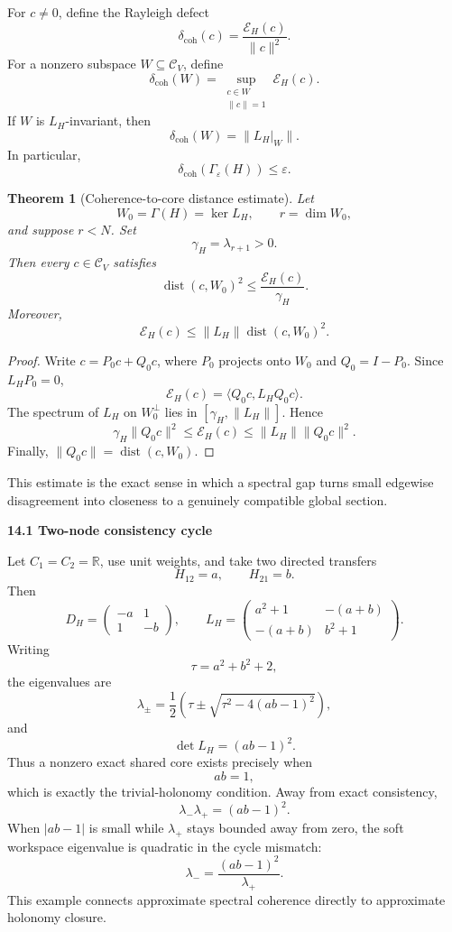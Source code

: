 \documentclass[11pt,letterpaper]{article}
\newcommand{\subtopic}[1]{%
 \vspace{0.45em}
 {\bfseries\color{AccentColor} #1\par}
}
\theoremstyle{plain}
\newtheorem{theorem}{Theorem}
\theoremstyle{definition}
\begin{document}
For \(c\neq0\), define the Rayleigh defect
\[
\delta_{\mathrm{coh}}(c)
=
\frac{\mathcal E_H(c)}{\|c\|^2}.
\]
For a nonzero subspace \(W\subseteq\mathcal C_V\), define
\[
\delta_{\mathrm{coh}}(W)
=
\sup_{\substack{c\in W\\\|c\|=1}}
\mathcal E_H(c).
\]
If \(W\) is \(L_H\)-invariant, then
\[
\delta_{\mathrm{coh}}(W)
=
\|L_H|_W\|.
\]
In particular,
\[
\delta_{\mathrm{coh}}(\Gamma_\varepsilon(H))
\leq\varepsilon.
\]

\begin{theorem}[Coherence-to-core distance estimate]\label{thm:poincare-workspace}
Let
\[
W_0=\Gamma(H)=\ker L_H,
\qquad
r=\dim W_0,
\]
and suppose \(r<N\). Set
\[
\gamma_H=\lambda_{r+1}>0.
\]
Then every \(c\in\mathcal C_V\) satisfies
\[
\boxed{
\operatorname{dist}(c,W_0)^2
\leq
\frac{\mathcal E_H(c)}{\gamma_H}.
}
\]
Moreover,
\[
\mathcal E_H(c)
\leq
\|L_H\|\operatorname{dist}(c,W_0)^2.
\]
\end{theorem}

\begin{proof}
Write \(c=P_0c+Q_0c\), where \(P_0\) projects onto \(W_0\) and
\(Q_0=I-P_0\). Since \(L_HP_0=0\),
\[
\mathcal E_H(c)
=
\langle Q_0c,L_HQ_0c\rangle.
\]
The spectrum of \(L_H\) on \(W_0^\perp\) lies in
\([\gamma_H,\|L_H\|]\). Hence
\[
\gamma_H\|Q_0c\|^2
\leq
\mathcal E_H(c)
\leq
\|L_H\|\|Q_0c\|^2.
\]
Finally, \(\|Q_0c\|=\operatorname{dist}(c,W_0)\).
\end{proof}

This estimate is the exact sense in which a spectral gap turns small edgewise
disagreement into closeness to a genuinely compatible global section.

\subtopic{14.1 Two-node consistency cycle}

Let \(C_1=C_2=\mathbb R\), use unit weights, and take two directed transfers
\[
H_{12}=a,
\qquad
H_{21}=b.
\]
Then
\[
D_H
=
\begin{pmatrix}
-a&1\\
1&-b
\end{pmatrix},
\qquad
L_H
=
\begin{pmatrix}
a^2+1&-(a+b)\\
-(a+b)&b^2+1
\end{pmatrix}.
\]
Writing
\[
\tau=a^2+b^2+2,
\]
the eigenvalues are
\[
\lambda_\pm
=
\frac{1}{2}
\left(
\tau\pm\sqrt{\tau^2-4(ab-1)^2}
\right),
\]
and
\[
\det L_H=(ab-1)^2.
\]
Thus a nonzero exact shared core exists precisely when
\[
ab=1,
\]
which is exactly the trivial-holonomy condition. Away from exact consistency,
\[
\lambda_-\lambda_+=(ab-1)^2.
\]
When \(|ab-1|\) is small while \(\lambda_+\) stays bounded away from zero, the
soft workspace eigenvalue is quadratic in the cycle mismatch:
\[
\lambda_-
=
\frac{(ab-1)^2}{\lambda_+}.
\]
This example connects approximate spectral coherence directly to approximate
holonomy closure.
\end{document}
